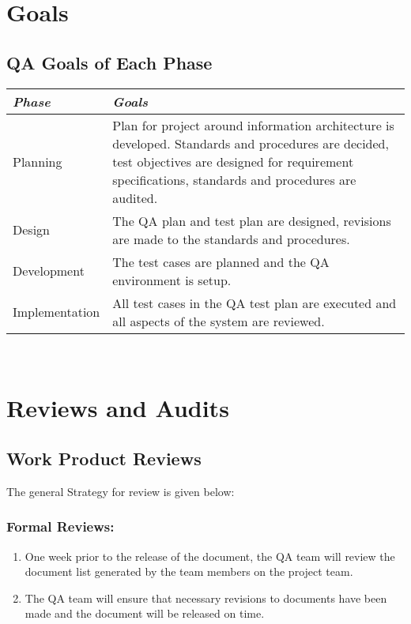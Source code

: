 \documentclass[a3paper, 11pt]{article}
\begin{document}
\section{Goals}
\subsection{QA Goals of Each Phase}
	\begin{tabular} {|l|p{13cm}|}
		\hline
		\textit{\textbf{Phase}} & \textit{\textbf{Goals}} \\ \hline
		Planning & Plan for project around information architecture is developed. Standards and procedures are decided, test objectives are designed for requirement specifications, standards and procedures are audited.   \\ \hline
		Design & The QA plan and test plan are designed, revisions are made to the standards and procedures.   \\ \hline
		Development & The test cases are planned and the QA environment is setup.  \\ \hline
		Implementation & All test cases in the QA test plan are executed and all aspects of the system are reviewed. \\ \hline
	\end{tabular}
\\
\par

\section{Reviews and Audits}
\subsection{Work Product Reviews}
The general Strategy for review is given below:

\subsubsection{Formal Reviews:}
\begin{enumerate}
	\setlength\itemsep{-0.25em}
	\item One week prior to the release of the document, the QA team will review the document list generated by the team members on the project team. 
	\item The QA team will ensure that necessary revisions to documents have been made and the document will be released on time. 
\end{enumerate}
\end{document}
